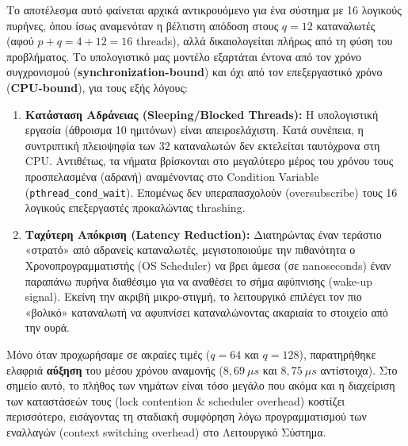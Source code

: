 \documentclass[11pt,a4paper]{article}
\begin{document}
Το αποτέλεσμα αυτό φαίνεται αρχικά αντικρουόμενο για ένα σύστημα με 16 λογικούς πυρήνες, όπου ίσως αναμενόταν η βέλτιστη απόδοση στους $q=12$ καταναλωτές (αφού $p+q = 4+12=16$ threads), αλλά δικαιολογείται πλήρως από τη φύση του προβλήματος. Το υπολογιστικό μας μοντέλο εξαρτάται έντονα από τον χρόνο συγχρονισμού (\textbf{synchronization-bound}) και όχι από τον επεξεργαστικό χρόνο (\textbf{CPU-bound}), για τους εξής λόγους:

\begin{enumerate}
    \item \textbf{Κατάσταση Αδράνειας (Sleeping/Blocked Threads):} Η υπολογιστική εργασία (άθροισμα 10 ημιτόνων) είναι απειροελάχιστη. Κατά συνέπεια, η συντριπτική πλειοψηφία των 32 καταναλωτών δεν εκτελείται ταυτόχρονα στη CPU. Αντιθέτως, τα νήματα βρίσκονται στο μεγαλύτερο μέρος του χρόνου τους προσπελασμένα (αδρανή) αναμένοντας στο Condition Variable (\texttt{pthread\_cond\_wait}). Επομένως δεν υπεραπασχολούν (oversubscribe) τους 16 λογικούς επεξεργαστές προκαλώντας thrashing.
    \item \textbf{Ταχύτερη Απόκριση (Latency Reduction):} Διατηρώντας έναν τεράστιο «στρατό» από αδρανείς καταναλωτές, μεγιστοποιούμε την πιθανότητα ο Χρονοπρογραμματιστής (OS Scheduler) να βρει άμεσα (σε nanoseconds) έναν παραπάνω πυρήνα διαθέσιμο για να αναθέσει το σήμα αφύπνισης (wake-up signal). Εκείνη την ακριβή μικρο-στιγμή, το λειτουργικό επιλέγει τον πιο «βολικό» καταναλωτή να αφυπνίσει καταναλώνοντας ακαριαία το στοιχείο από την ουρά.
\end{enumerate}

Μόνο όταν προχωρήσαμε σε ακραίες τιμές ($q=64$ και $q=128$), παρατηρήθηκε ελαφριά \textbf{αύξηση} του μέσου χρόνου αναμονής ($8,69\ \mu s$ και $8,75\ \mu s$ αντίστοιχα). Στο σημείο αυτό, το πλήθος των νημάτων είναι τόσο μεγάλο που ακόμα και η διαχείριση των καταστάσεών τους (lock contention \& scheduler overhead) κοστίζει περισσότερο, εισάγοντας τη σταδιακή συμφόρηση λόγω προγραμματισμού των εναλλαγών (context switching overhead) στο Λειτουργικό Σύστημα.
\end{document}
